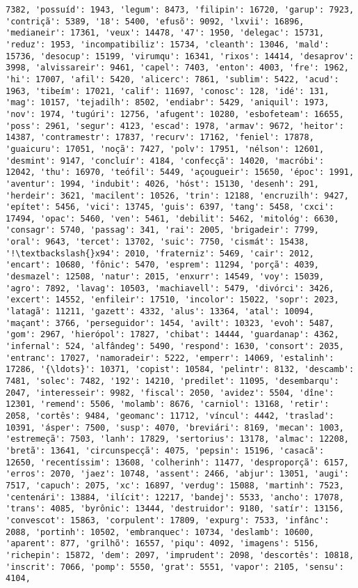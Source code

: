 \documentclass[11pt]{article}
\begin{document}
\begin{Verbatim}[commandchars=\\\{\}]
7382, 'possuíd': 1943, 'legum': 8473, 'filipin': 16720, 'garup': 7923, 'contriçã': 5389, '18': 5400, 'efusõ': 9092, 'lxvii': 16896, 'medianeir': 17361, 'veux': 14478, '47': 1950, 'delegac': 15731, 'reduz': 1953, 'incompatibiliz': 15734, 'cleanth': 13046, 'mald': 15736, 'desocup': 15199, 'virumqu': 16341, 'rixos': 14414, 'desaprov': 3998, 'alvissareir': 9461, 'capel': 7403, 'enton': 4003, 'fre': 1962, 'hi': 17007, 'afil': 5420, 'alicerc': 7861, 'sublim': 5422, 'acud': 1963, 'tibeím': 17021, 'calif': 11697, 'conosc': 128, 'idé': 131, 'mag': 10157, 'tejadilh': 8502, 'endiabr': 5429, 'aniquil': 1973, 'nov': 1974, 'tugúri': 12756, 'afugent': 10280, 'esbofeteam': 16655, 'poss': 2961, 'segur': 4123, 'escad': 1978, 'armav': 9672, 'heitor': 14387, 'contramestr': 17837, 'recurv': 17162, 'feniel': 17878, 'guaicuru': 17051, 'noçã': 7427, 'polv': 17951, 'nélson': 12601, 'desmint': 9147, 'concluír': 4184, 'confecçã': 14020, 'macróbi': 12042, 'thu': 16970, 'teófil': 5449, 'açougueir': 15650, 'époc': 1991, 'aventur': 1994, 'indubit': 4026, 'hóst': 15130, 'desenh': 291, 'herdeir': 3621, 'macilent': 10526, 'trin': 12188, 'encruzilh': 9427, 'epítet': 5456, 'vici': 13745, 'guis': 6397, 'tang': 5458, 'cxci': 17494, 'opac': 5460, 'ven': 5461, 'debilit': 5462, 'mitológ': 6630, 'consagr': 5740, 'passag': 341, 'rai': 2005, 'brigadeir': 7799, 'oral': 9643, 'tercet': 13702, 'suic': 7750, 'cismát': 15438, '!\textbackslash{}x94': 2010, 'fraterniz': 5469, 'cair': 2012, 'encart': 10680, 'fônic': 5470, 'esprem': 11294, 'porçã': 4039, 'desmazel': 12508, 'natur': 2015, 'enxurr': 14549, 'voy': 15039, 'agro': 7892, 'lavag': 10503, 'machiavell': 5479, 'divórci': 3426, 'excert': 14552, 'enfileir': 17510, 'incolor': 15022, 'sopr': 2023, 'latagã': 11211, 'gazett': 4332, 'alus': 13364, 'atal': 10094, 'maçant': 3766, 'perseguidor': 1454, 'avilt': 10323, 'evoh': 5487, 'gom': 2967, 'hierópol': 17827, 'chibat': 14444, 'guardanap': 4362, 'infernal': 524, 'alfândeg': 5490, 'respond': 1630, 'consort': 2035, 'entranc': 17027, 'namoradeir': 5222, 'emperr': 14069, 'estalinh': 17286, '{\ldots}': 10371, 'copist': 10584, 'pelintr': 8132, 'descamb': 7481, 'solec': 7482, '192': 14210, 'predilet': 11095, 'desembarqu': 2047, 'interesseir': 9982, 'fiscal': 2050, 'avidez': 5504, 'dîne': 12301, 'remend': 5506, 'molamb': 8676, 'carniol': 13168, 'retir': 2058, 'cortês': 9484, 'geomanc': 11712, 'víncul': 4442, 'traslad': 10391, 'ásper': 7500, 'susp': 4070, 'breviári': 8169, 'mecan': 1003, 'estremeçã': 7503, 'lanh': 17829, 'sertorius': 13178, 'almac': 12208, 'bretã': 13641, 'circunspecçã': 4075, 'pepsin': 15196, 'casacã': 12650, 'recentíssim': 13608, 'colherinh': 11477, 'desproporçã': 6157, 'erros': 2070, 'jaez': 10748, 'assent': 2466, 'abjur': 13051, 'augi': 7517, 'capuch': 2075, 'xc': 16897, 'verdug': 15088, 'martinh': 7523, 'centenári': 13884, 'ilícit': 12217, 'bandej': 5533, 'ancho': 17078, 'trans': 4085, 'byrônic': 13444, 'destruidor': 9180, 'satír': 13156, 'convescot': 15863, 'corpulent': 17809, 'expurg': 7533, 'infânc': 2088, 'portinh': 10502, 'embranquec': 10734, 'deslamb': 10600, 'aparent': 877, 'grilhõ': 16557, 'piqu': 4092, 'imagens': 5156, 'richepin': 15872, 'dem': 2097, 'imprudent': 2098, 'descortês': 10818, 'inscrit': 7066, 'pomp': 5550, 'grat': 5551, 'vapor': 2105, 'sensu': 4104, 
\end{Verbatim}
\end{document}
